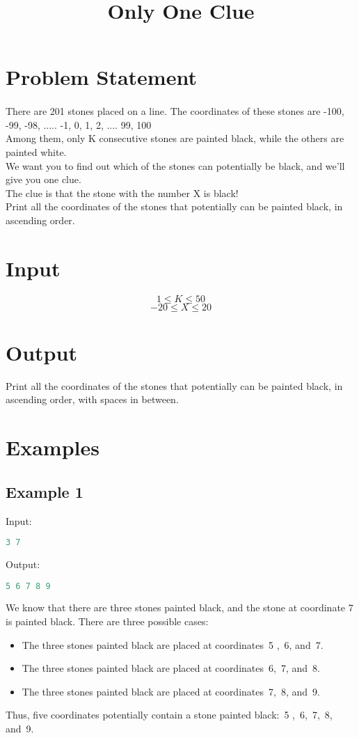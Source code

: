 \documentclass[10pt]{article}
\begin{document}
\title{Only One Clue}
 \date{}
\maketitle
\section{Problem Statement}
\paragraph{}
There are 201 stones placed on a line. The coordinates of these stones are -100, -99, -98, ..... -1, 0, 1, 2, .... 99, 100\\
Among them, only K consecutive stones are painted black, while the others are painted white.\\
We want you to find out which of the stones can potentially be black, and we’ll give you one clue.\\
The clue is that the stone with the number X is black!\\
Print all the coordinates of the stones that potentially can be painted black, in ascending order.
\section{Input}
$$ 1\le K \le 50 $$
$$ -20\le X \le 20 $$
\section{Output}
Print all the coordinates of the stones that potentially can be painted black, in ascending order, with spaces in between.
\section{Examples}
\subsection{Example 1}
Input:
\begin{lstlisting}[language=Python]
3 7
\end{lstlisting}
Output:
\begin{lstlisting}[language=Python]
5 6 7 8 9
\end{lstlisting}
We know that there are three stones painted black, and the stone at coordinate 7 is painted black. There are three possible cases:
\begin{itemize}
\item The three stones painted black are placed at coordinates 5 , 6, and 7.
\item The three stones painted black are placed at coordinates 6, 7, and 8.
\item The three stones painted black are placed at coordinates 7, 8, and 9.
\end{itemize}
Thus, five coordinates potentially contain a stone painted black: 5 , 6, 7, 8, and 9.
\end{document}
